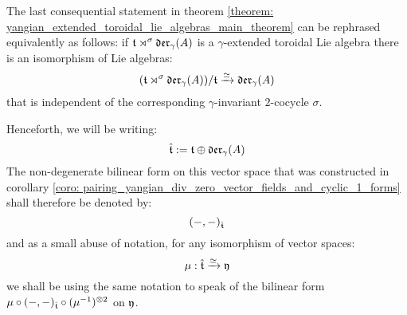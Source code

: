         \begin{remark}
            The last consequential statement in theorem \ref{theorem: yangian_extended_toroidal_lie_algebras_main_theorem} can be rephrased equivalently as follows: if $\mathfrak{t} \rtimes^{\sigma} \mathfrak{der}_{\gamma}(A)$ is a $\gamma$-extended toroidal Lie algebra there is an isomorphism of Lie algebras:
                $$( \mathfrak{t} \rtimes^{\sigma} \mathfrak{der}_{\gamma}(A) )/\mathfrak{t} \xrightarrow[]{\simeq} \mathfrak{der}_{\gamma}(A)$$
            that is independent of the corresponding $\gamma$-invariant $2$-cocycle $\sigma$.
        \end{remark}
        \begin{remark}
        \end{remark}
        
        \begin{convention}
            Henceforth, we will be writing:
                $$\hat{\mathfrak{t}} := \mathfrak{t} \oplus \mathfrak{der}_{\gamma}(A)$$
            The non-degenerate bilinear form on this vector space that was constructed in corollary \ref{coro: pairing_yangian_div_zero_vector_fields_and_cyclic_1_forms} shall therefore be denoted by:
                $$(-, -)_{\hat{\mathfrak{t}}}$$
            and as a small abuse of notation, for any isomorphism of vector spaces:
                $$\mu: \hat{\mathfrak{t}} \xrightarrow[]{\simeq} \mathfrak{y}$$
            we shall be using the same notation to speak of the bilinear form $\mu \circ (-, -)_{\extendedtoroidal} \circ (\mu^{-1})^{\tensor 2}$ on $\mathfrak{y}$. 
        \end{convention}
    
